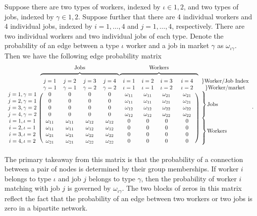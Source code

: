 \documentclass[12pt]{article}
\def\ig{\iota\gamma}
\def\g{\gamma}
\def\i{\iota}
\def\o{\omega}
\theoremstyle{definition}
\theoremstyle{plain}
\begin{document}
Suppose there are two types of workers, indexed by $\i \in 1,2$, and two types of jobs, indexed by $\g\in 1,2$. Suppose further that there are 4 individual workers and 4 individual jobs, indexed by $i=1,\dots,4$ and $j=1,\dots,4$, respectively. There are two individual workers and two individual jobs of each type. Denote the probability of an edge between a type $\i$ worker and a job in market $\g$ as $\omega_{\ig}$. Then we have the following edge probability matrix
\begin{align*}
\begin{blockarray}{cccccccccc}
& \multicolumn{4}{c}{Jobs} & \multicolumn{4}{c}{Workers} & \\
& \multicolumn{4}{c}{$\overbrace{\rule{5cm}{0pt}}$} & \multicolumn{4}{c}{$\overbrace{\rule{5cm}{0pt}}$} & \\
& j=1     & j=2	& j=3	  & j=4     & i=1     & i=2     & i=3	  & i=4     & \} \text{Worker/Job Index}\\
& \g=1	& \g=1	& \g=2	& \g=2		& \i=1		& \i=1	& \i=2		& \i=2	& \}\text{Worker/market}\\
\begin{block}{c(cccccccc)l}
j=1,\g=1 & 0       & 0       & 0	   & 0	     & \o_{11} & \o_{11} & \o_{21} & \o_{21} & \rdelim\} {4}{10pt} \multirow{4}{*}{Jobs} \\
j=2,\g=1 & 0       & 0       & 0       & 0       & \o_{11} & \o_{11} & \o_{21} & \o_{21} & \\					  
j=3,\g=2 & 0       & 0       & 0       & 0       & \o_{12} & \o_{12} & \o_{22} & \o_{22} & \\     					  
j=4,\g=2 & 0       & 0       & 0       & 0       & \o_{12} & \o_{12} & \o_{22} & \o_{22} & \\ 					    
i=1,\i=1 & \o_{11} & \o_{11} & \o_{12} & \o_{12} & 0       & 0       & 0       & 0       & \rdelim\} {4}{10pt} \multirow{4}{*}{Workers} \\
i=2,\i=1 & \o_{11} & \o_{11} & \o_{12} & \o_{12} & 0       & 0       & 0       & 0       & \\					  
i=3,\i=2 & \o_{21} & \o_{21} & \o_{22} & \o_{22} & 0       & 0       & 0       & 0       & \\					  
i=4,\i=2 & \o_{21} & \o_{21} & \o_{22} & \o_{22} & 0       & 0       & 0       & 0       & \\					  				  
\end{block}
\end{blockarray}.
\end{align*}   
The primary takeaway from this matrix is that the probability of a connection between a pair of nodes is determined by their group memberships. If worker $i$ belongs to type $\i$ and job $j$ belongs to type $\g$, then the probability of worker $i$ matching with job $j$ is governed by $\omega_{\ig}$. The two blocks of zeros in this matrix reflect the fact that the probability of an edge between two workers or two jobs is zero in a bipartite network. 
\end{document}

